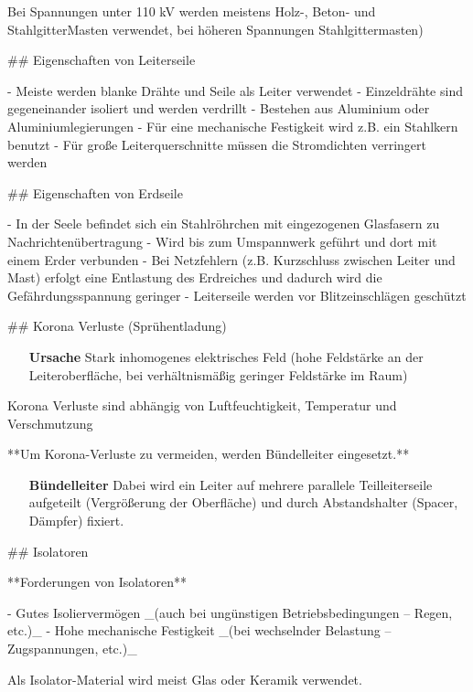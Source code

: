 \begin{markdown}

Bei Spannungen unter 110 kV werden meistens Holz-, Beton- und StahlgitterMasten verwendet, bei höheren Spannungen Stahlgittermasten)

## Eigenschaften von Leiterseile

- Meiste werden blanke Drähte und Seile als Leiter verwendet
- Einzeldrähte sind gegeneinander isoliert und werden verdrillt
- Bestehen aus Aluminium oder Aluminiumlegierungen
- Für eine mechanische Festigkeit wird z.B. ein Stahlkern benutzt
- Für große Leiterquerschnitte müssen die Stromdichten verringert werden

## Eigenschaften von Erdseile

- In der Seele befindet sich ein Stahlröhrchen mit eingezogenen Glasfasern zu Nachrichtenübertragung
- Wird bis zum Umspannwerk geführt und dort mit einem Erder verbunden
- Bei Netzfehlern (z.B. Kurzschluss zwischen Leiter und Mast) erfolgt eine Entlastung des Erdreiches und dadurch wird die Gefährdungsspannung geringer
- Leiterseile werden vor Blitzeinschlägen geschützt

## Korona Verluste (Sprühentladung)


\begin{itemize}
    \item[\textbf{Ursache}] Stark inhomogenes elektrisches Feld (hohe Feldstärke an der Leiteroberfläche, bei verhältnismäßig geringer Feldstärke im Raum)
\end{itemize}

Korona Verluste sind abhängig von Luftfeuchtigkeit, Temperatur und
Verschmutzung

**Um Korona-Verluste zu vermeiden, werden Bündelleiter eingesetzt.**

\vspace*{1em}

\begin{itemize}
    \item[\textbf{Bündelleiter}] Dabei wird ein Leiter auf mehrere parallele Teilleiterseile aufgeteilt (Vergrößerung der Oberfläche) und durch Abstandshalter (Spacer, Dämpfer) fixiert.
\end{itemize}

## Isolatoren


**Forderungen von Isolatoren**

- Gutes Isoliervermögen _(auch bei ungünstigen Betriebsbedingungen – Regen, etc.)_
- Hohe mechanische Festigkeit _(bei wechselnder Belastung – Zugspannungen, etc.)_

Als Isolator-Material wird meist Glas oder Keramik verwendet.

\end{markdown}